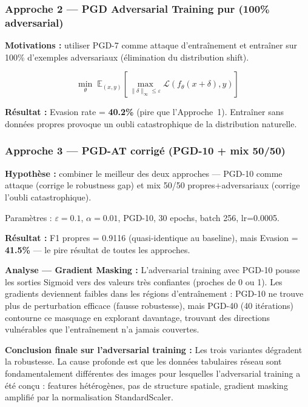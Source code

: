 \documentclass[11pt,a4paper]{article}
\begin{document}
\subsubsection*{Approche 2 --- PGD Adversarial Training pur (100\% adversarial)}

\textbf{Motivations :} utiliser PGD-7 comme attaque d'entra\^inement et entra\^iner sur 100\%
d'exemples adversariaux (\'elimination du distribution shift).

\[
\min_\theta\; \mathbb{E}_{(x,y)}\!\left[\max_{\|\delta\|_\infty \leq \varepsilon} \mathcal{L}(f_\theta(x+\delta), y)\right]
\]

\textbf{R\'esultat :} Evasion rate = \textcolor{myred}{\textbf{40.2\%}} (pire que l'Approche~1).
Entra\^iner sans donn\'ees propres provoque un oubli catastrophique de la distribution naturelle.

\subsubsection*{Approche 3 --- PGD-AT corrig\'e (PGD-10 + mix 50/50)}

\textbf{Hypoth\`ese :} combiner le meilleur des deux approches --- PGD-10 comme attaque
(corrige le robustness gap) et mix 50/50 propres+adversariaux (corrige l'oubli catastrophique).

Param\`etres : $\varepsilon=0.1$, $\alpha=0.01$, PGD-10, 30 epochs, batch 256, lr=0.0005.

\textbf{R\'esultat :} F1 propres = 0.9116 (quasi-identique au baseline), mais Evasion = \textcolor{myred}{\textbf{41.5\%}} ---
le pire r\'esultat de toutes les approches.

\textbf{Analyse --- Gradient Masking :}
L'adversarial training avec PGD-10 pousse les sorties Sigmoid vers des valeurs tr\`es confiantes
(proches de 0 ou 1). Les gradients deviennent faibles dans les r\'egions d'entra\^inement :
PGD-10 ne trouve plus de perturbation efficace (fausse robustesse),
mais PGD-40 (40 it\'erations) contourne ce masquage en explorant davantage,
trouvant des directions vuln\'erables que l'entra\^inement n'a jamais couvertes.

\textbf{Conclusion finale sur l'adversarial training :}
Les trois variantes d\'egradent la robustesse. La cause profonde est que les donn\'ees tabulaires
r\'eseau sont fondamentalement diff\'erentes des images pour lesquelles l'adversarial training
a \'et\'e con\c{c}u : features h\'et\'erog\`enes, pas de structure spatiale, gradient masking
amplifi\'e par la normalisation StandardScaler.
\end{document}
